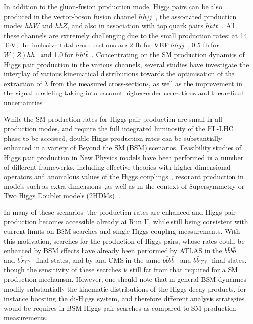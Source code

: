 In addition to the gluon-fusion production mode, Higgs pairs
can be also produced in the vector-boson fusion
channel $hhjj$~\cite{Contino:2010mh,Dolan:2013rja,Dolan:2015zja},
the associated production modes $hhW$ and $hhZ$, and also in association
with top quark pairs $hht\bar{t}$~\cite{Englert:2014uqa}.
%
All these channels are extremely challenging due to the small production
rates: at 14 TeV, the inclusive total cross-sections are
2 fb for VBF $hhjj$~\cite{Liu-Sheng:2014gxa},
0.5 fb for $W(Z)hh$~\cite{baglio}
and 1.0 for $hht\bar{t}$~\cite{Englert:2014uqa}.
%
Concentrating on the SM production dynamics of Higgs pair
production in the various channels, several studies
have investigate the interplay of various kinematical
distributions towards the optimisation of the
extraction of $\lambda$ from the measured
cross-sections, as well as the improvement
in the signal modeling taking into account
higher-order corrections and theoretical
uncertainties~\cite{Slawinska:2014vpa,Chen:2014xra,Goertz:2013kp,Frederix:2014hta,Dawson:2015oha,Maltoni:2014eza}
%


While the SM production rates for Higgs
pair production are small in all production modes,
and require the full integrated luminosity of the HL-LHC phase
to be accessed, double Higgs production rates can be substantially
enhanced in a variety of Beyond the SM (BSM) scenarios.
%
Feasibility studies of Higgs pair production in New Physics
models have been performed in a number of different frameworks,
including effective theories with higher-dimensional
operators and anomalous values of the
Higgs couplings~\cite{Nishiwaki:2013cma,Dall'Osso:2015aia,Azatov:2015oxa,Liu:2014rba,Goertz:2014qta,He:2015spf,Grober:2015cwa}, resonant production
in models such as extra dimensions~\cite{Gouzevitch:2013qca,Cooper:2013kia,No:2013wsa},as well as
in the context of Supersymmetry or Two Higgs Doublet models (2HDMs)~\cite{Belyaev:1999kk,Han:2013sga,Hespel:2014sla,Wu:2015nba,Cao:2014kya,Ellwanger:2013ova}.

%
In many of these scenarios, the production rates are enhanced
and Higgs pair production becomes accessible already at
Run II, while still being consistent with current limits on BSM searches
and single Higgs coupling measurements.
%
With this motivation, searches for the production of Higgs pairs, whose rates
could be enhanced by BSM effects have already been performed
by ATLAS in the $b\bar{b}b\bar{b}$~\cite{Aad:2015uka}
and $b\bar{b}\gamma\gamma$~\cite{Aad:2014yja} final states,
and by
and CMS in the same $b\bar{b}b\bar{b}$~\cite{Khachatryan:2015yea}
and $b\bar{b}\gamma\gamma$~\cite{Chatrchyan:2011wt} final
states.
%
though the sensitivity of these searches is still far from
that required for a SM production mechanism.
%
However, one should note that in general BSM dynamics modify substantially
the kinematic distributions of the Higgs decay products, for
instance boosting the di-Higgs system, and therefore
different analysis strategies would be requires in BSM
Higgs pair searches as compared to SM production measurements.

